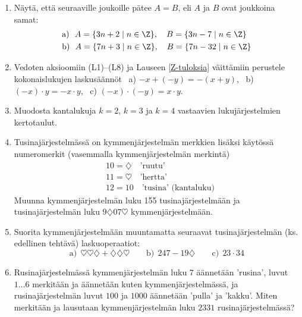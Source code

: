 \Harj
\begin{enumerate}

\item
Näytä, että seuraaville joukoille pätee $A=B$, eli $A$ ja $B$ ovat joukkoina samat:
\begin{align*}
&\text{a)}\ \ A=\{3n+2 \mid n\in\Z\}, \quad B=\{3n-7 \mid n\in\Z\} \\
&\text{b)}\ \ A=\{7n+3 \mid n\in\Z\}, \quad B=\{7n-32 \mid n\in\Z\}
\end{align*}

\item
Vedoten aksioomiin (L1)--(L8) ja Lauseen \ref{Z-tuloksia} väittämiin perustele kokonaislukujen
laskusäännöt \ a) $-x+(-y)=-(x+y)$, \ b) $(-x) \cdot y = - x\cdot y$, \
c) $(-x) \cdot (-y) = x \cdot y$.

\item 
Muodosta kantalukuja $k=2$, $k=3$ ja $k=4$ vastaavien lukujärjestelmien kertotaulut.

\item 
Tusinajärjestelmässä on kymmenjärjestelmän merkkien lisäksi käytössä numeromerkit (vasemmalla 
kymmenjärjestelmän merkintä)
\begin{align*}
&10=\diamondsuit \quad \text{'ruutu'} \\
&11=\heartsuit \quad \text{'hertta'} \\
&12=10 \quad \text{'tusina' (kantaluku)}
\end{align*}
Muunna kymmenjärjestelmän luku 155 tusinajärjestelmään ja tusinajärjestelmän luku 
$9\diamondsuit 07\heartsuit$ kymmenjärjestelmään.

\item 
Suorita kymmenjärjestelmään muuntamatta seuraavat tusinajärjestelmän (ks. edellinen tehtävä) 
laskuoperaatiot:
\[
\text{a)}\ \ \heartsuit\heartsuit\diamondsuit + \diamondsuit\diamondsuit\heartsuit \qquad 
\text{b)}\ \  247-19\diamondsuit \qquad 
\text{c)}\ \ 23 \cdot 34
\]

\item
Rusinajärjestelmässä kymmenjärjestelmän luku $7$ äännetään 'rusina', luvut $1 \ldots 6$
merkitään ja äännetään kuten kymmenjärjestelmässä, ja rusinajärjestelmän luvut $100$ ja
$1000$ äännetään 'pulla' ja 'kakku'. Miten merkitään ja lausutaan kymmenjärjestelmän luku $2331$
rusinajärjestelmässä?


\end{enumerate}
